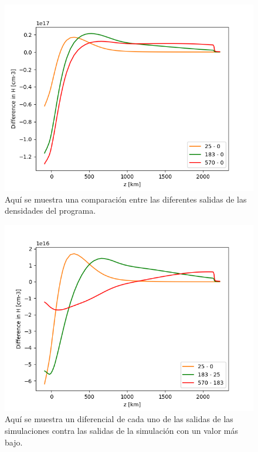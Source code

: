 \documentclass[9pt]{book}
\begin{document}
\begin{figure}[h]
\centering
\includegraphics[scale=1]{am_diferencias_absolutas}
\caption{ Aqu\'i se muestra una comparaci\'on entre las diferentes salidas de las densidades del programa.}
\label{am_diferencias_absolutas}
\end{figure}

\begin{figure}[h]
\centering
\includegraphics[scale=1]{am_diferencias_relativas}
\caption{ Aqu\'i se muestra un diferencial de cada uno de las salidas de las simulaciones contra las salidas de la simulaci\'on con un valor m\'as bajo.}
\label{am_diferencias_relativas}
\end{figure}
\end{document}
